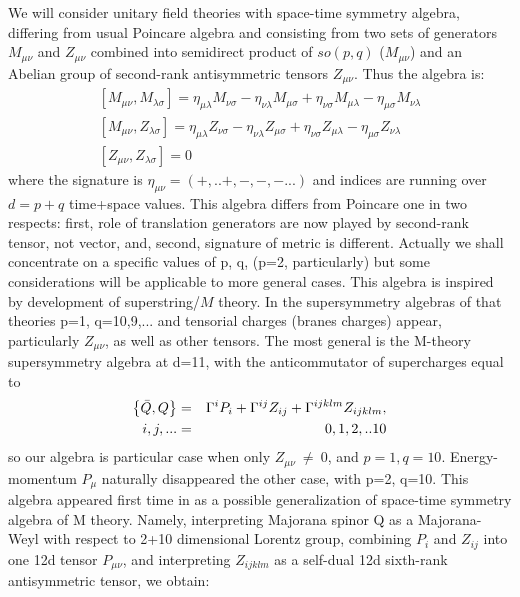 \documentclass[a4paper,12pt]{article}
\begin{document}
        We will consider unitary field theories
with space-time symmetry algebra, differing from usual Poincare
algebra and consisting from two sets of generators  $M_{\mu \nu }$
and
$Z_{\mu \nu }$  combined into semidirect product of $so(p,q)$ ($%
M_{\mu \nu }$) and an Abelian group of second-rank antisymmetric
tensors $Z_{\mu \nu }$. Thus the algebra is:
\begin{equation}
\begin{array}{l}
[M_{\mu \nu } ,M_{\lambda \sigma } ] = \eta _{\mu \lambda } M_{\nu
\sigma }  - \eta _{\nu \lambda } M_{\mu \sigma }  + \eta _{\nu
\sigma } M_{\mu \lambda }  - \eta _{\mu \sigma } M_{\nu \lambda } \label{mmz} \\
\left[M_{\mu \nu } ,Z_{\lambda \sigma } \right] = \eta _{\mu
\lambda } Z_{\nu \sigma }  - \eta _{\nu \lambda } Z_{\mu \sigma }
+ \eta _{\nu
\sigma } Z_{\mu \lambda }  - \eta _{\mu \sigma } Z_{\nu \lambda }\\
\left[Z_{\mu \nu } ,Z_{\lambda \sigma }\right]=0
\end{array}
\end{equation}
where the signature is $\eta_{\mu\nu}=(+,..+,-,-,-...)$ and
indices are running over $d=p+q$ time+space values. This algebra
differs from Poincare one in two respects: first, role of
translation generators are now played by second-rank tensor, not
vector, and, second, signature of metric is different. Actually we
shall concentrate on a specific values of p, q, (p=2,
particularly) but some considerations will be applicable to more
general cases.
    This algebra is inspired by development of superstring/$M$ theory. In the
supersymmetry algebras of that theories \cite{F} p=1, q=10,9,...
and tensorial charges (branes charges) appear, particularly
$Z_{\mu \nu}$, as well as other tensors. The most general is the
M-theory supersymmetry algebra at d=11, with the anticommutator of
supercharges equal to
\begin{eqnarray}
\left\{ \bar{Q},Q\right\} &=&\Gamma ^{i}P_{i}+\Gamma
^{ij}Z_{ij}+\Gamma
^{ijklm}Z_{ijklm},  \label{1} \\
i,j,... &=&0,1,2,..10  \notag
\end{eqnarray}
so our algebra is particular case when  only $Z_{\mu \nu}\ \ne\
0$, and $p=1, q=10$. Energy-momentum $P_{\mu}$ naturally
disappeared the other case, with p=2, q=10. This algebra appeared
first time in \cite{Bars} as a possible generalization of
space-time symmetry algebra of M theory. Namely, interpreting
Majorana spinor Q as a Majorana-Weyl with respect to 2+10
dimensional Lorentz group, combining $P_{i}$ and $Z_{ij}$ into one
12d tensor $P_{\mu \nu }$, and interpreting $Z_{ijklm}$ as a
self-dual 12d sixth-rank antisymmetric tensor, we obtain:
\end{document}

